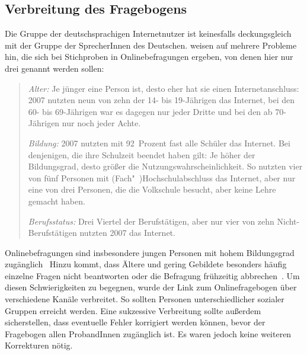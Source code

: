 \subsection{Verbreitung des Fragebogens}
\label{sec:VerbreitungFragebogen}
Die Gruppe der deutschsprachigen Internetnutzer ist keinesfalls deckungsgleich mit der Gruppe der SprecherInnen des Deutschen. \citet{Baur2009} weisen auf mehrere Probleme hin, die sich bei Stichproben in Onlinebefragungen ergeben, von denen hier nur drei genannt werden sollen:
\begin{quote}\textit{Alter: }Je jünger eine Person ist, desto eher hat sie einen Internetanschluss: 2007 nutzten neun von zehn der 14- bis 19-Jährigen das Internet, bei den 60- bis 69-Jährigen war es dagegen nur jeder Dritte und bei den ab 70-Jährigen nur noch jeder Achte.

\textit{Bildung: }2007 nutzten mit 92~Prozent fast alle Schüler das Internet. Bei denjenigen, die ihre Schulzeit beendet haben gilt: Je höher der Bildungsgrad, desto größer die Nutzungswahrscheinlichkeit. So nutzten vier von fünf Personen mit (Fach"~)Hochschulabschluss das Internet, aber nur eine von drei Personen, die die Volkschule besucht, aber keine Lehre gemacht haben.

\textit{Berufsstatus: }Drei Viertel der Berufstätigen, aber nur vier von zehn Nicht-Berufstätigen nutzten 2007 das Internet.~\citep[112--113]{Baur2009}\end{quote}
Onlinebefragungen sind insbesondere jungen Personen mit hohem Bildungsgrad zug{\"a}nglich~\citep[s.][114]{Baur2009}
Hinzu kommt, \glqq dass {\"A}ltere und gering Gebildete besonders h{\"a}ufig einzelne Fragen nicht beantworten oder die Befragung fr{\"u}hzeitig abbrechen\grqq{}~\citep[123]{Baur2009}.
Um diesen Schwierigkeiten zu begegnen, wurde der Link zum Onlinefragebogen über verschiedene Kanäle verbreitet. So sollten Personen unterschiedlicher sozialer Gruppen erreicht werden. Eine sukzessive Verbreitung sollte außerdem sicherstellen, dass eventuelle Fehler korrigiert werden können, bevor der Fragebogen allen ProbandInnen zugänglich ist. Es waren jedoch keine weiteren Korrekturen nötig.

